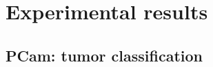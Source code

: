 \documentclass{article}
\begin{document}
%

\section{Experimental results}

\subsection{PCam: tumor classification}
\end{document}
